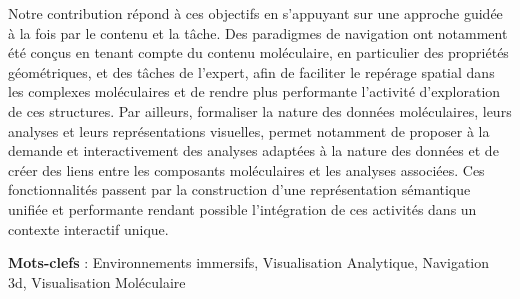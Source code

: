 Notre contribution répond à ces objectifs en s'appuyant sur une approche guidée à la fois par le contenu et la tâche. Des paradigmes de navigation ont notamment été conçus en tenant compte du contenu moléculaire, en particulier des propriétés géométriques, et des tâches de l'expert, afin de faciliter le repérage spatial dans les complexes moléculaires et de rendre plus performante l'activité d'exploration de ces structures. Par ailleurs, formaliser la nature des données moléculaires, leurs analyses et leurs représentations visuelles, permet notamment de proposer à la demande et interactivement des analyses adaptées à la nature des données et de créer des liens entre les composants moléculaires et les analyses associées. Ces fonctionnalités passent par la construction d'une représentation sémantique unifiée et performante rendant possible l'intégration de ces activités dans un contexte interactif unique.

\textbf{Mots-clefs} : Environnements immersifs, Visualisation Analytique, Navigation 3d, Visualisation Moléculaire


